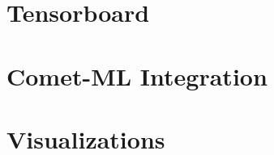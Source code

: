\documentclass[../../fyp.tex]{subfiles}
\begin{document}
 \label{chap:evaluation_methods}
\section{Tensorboard}


\section{Comet-ML Integration}


\section{Visualizations}



\end{document}
